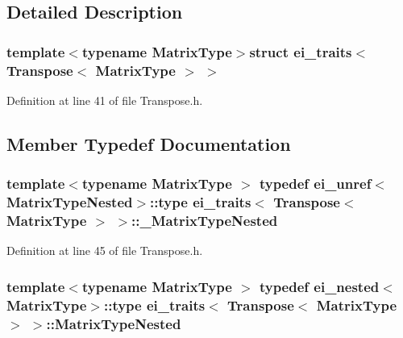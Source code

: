 \subsection{Detailed Description}
\subsubsection*{template$<$typename Matrix\-Type$>$struct ei\-\_\-traits$<$ Transpose$<$ Matrix\-Type $>$ $>$}



Definition at line 41 of file Transpose.\-h.



\subsection{Member Typedef Documentation}
\hypertarget{structei__traits_3_01_transpose_3_01_matrix_type_01_4_01_4_a77d81108d2f1302dbf2b34671fc5ba93}{
\subsubsection[{\-\_\-\-Matrix\-Type\-Nested}]{\setlength{\rightskip}{0pt plus 5cm}template$<$typename Matrix\-Type $>$ typedef {\bf ei\-\_\-unref}$<${\bf Matrix\-Type\-Nested}$>$\-::{\bf type} {\bf ei\-\_\-traits}$<$ {\bf Transpose}$<$ Matrix\-Type $>$ $>$\-::{\bf \-\_\-\-Matrix\-Type\-Nested}}}\label{structei__traits_3_01_transpose_3_01_matrix_type_01_4_01_4_a77d81108d2f1302dbf2b34671fc5ba93}


Definition at line 45 of file Transpose.\-h.

\hypertarget{structei__traits_3_01_transpose_3_01_matrix_type_01_4_01_4_a35db65ef32b6a264892beb1060f8fe4a}{
\subsubsection[{Matrix\-Type\-Nested}]{\setlength{\rightskip}{0pt plus 5cm}template$<$typename Matrix\-Type $>$ typedef {\bf ei\-\_\-nested}$<$Matrix\-Type$>$\-::{\bf type} {\bf ei\-\_\-traits}$<$ {\bf Transpose}$<$ Matrix\-Type $>$ $>$\-::{\bf Matrix\-Type\-Nested}}}\label{structei__traits_3_01_transpose_3_01_matrix_type_01_4_01_4_a35db65ef32b6a264892beb1060f8fe4a}


